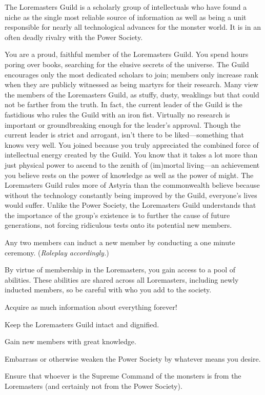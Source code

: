 \documentclass[blue]{guildcamp2}
\begin{document}
\name{\bLoremasters{}}


The Loremasters Guild is a scholarly group of intellectuals who have found a niche as the single most reliable source of information as well as being a unit responsible for nearly all technological advances for the monster world. It is in an often deadly rivalry with the Power Society.

You are a proud, faithful member of the Loremasters Guild. You spend hours poring over books, searching for the elusive secrets of the universe. The Guild encourages only the most dedicated scholars to join; members only increase rank when they are publicly witnessed as being martyrs for their research. Many view the members of the Loremasters Guild, as stuffy, dusty, weaklings but that could not be farther from the truth. In fact, the current leader of the Guild is the fastidious \cVampire{\full} who rules the Guild with an iron fist. Virtually no research is important or groundbreaking enough for the leader's approval. Though the current leader is strict and arrogant, \cVampire{\they} isn't there to be liked---something that \cVampire{\they} knows very well. You joined because you truly appreciated the combined force of intellectual energy created by the Guild. You know that it takes a lot more than just physical power to ascend to the zenith of (im)mortal living---an achievement you believe rests on the power of knowledge as well as the power of might. The Loremasters Guild rules more of Astyria than the commonwealth believe because without the technology constantly being improved by the Guild, everyone's lives would suffer. Unlike the Power Society, the Loremasters Guild understands that the importance of the group's existence is to further the cause of future generations, not forcing ridiculous tests onto its potential new members.

Any two members can induct a new member by conducting a one minute ceremony. (\emph{Roleplay accordingly.})

By virtue of membership in the Loremasters, you gain access to a pool of abilities. These abilities are shared across all Loremasters, including newly inducted members, so be careful with who you add to the society.

\begin{itemz}[Goals]
  \item Acquire as much information about everything forever!
  \item Keep the Loremasters Guild intact and dignified.
  \item Gain new members with great knowledge.
  \item Embarrass or otherwise weaken the Power Society by whatever means you desire.
  \item Ensure that whoever is the Supreme Command of the monsters is from the Loremasters (and certainly not from the Power Society).
\end{itemz}
\end{document}
